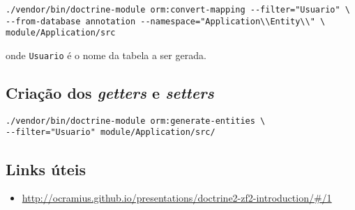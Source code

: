 \begin{verbatim}
./vendor/bin/doctrine-module orm:convert-mapping --filter="Usuario" \
--from-database annotation --namespace="Application\\Entity\\" \
module/Application/src
\end{verbatim}

onde \texttt{Usuario} é o nome da tabela a ser gerada.

\subsection{Criação dos \emph{getters} e
\emph{setters}}\label{criauxe7uxe3o-dos-getters-e-setters}

\begin{verbatim}
./vendor/bin/doctrine-module orm:generate-entities \
--filter="Usuario" module/Application/src/
\end{verbatim}

\subsection{Links úteis}\label{links-uxfateis}

\begin{itemize}
\itemsep1pt\parskip0pt
\item
  \url{http://ocramius.github.io/presentations/doctrine2-zf2-introduction/\#/1}
\end{itemize}

